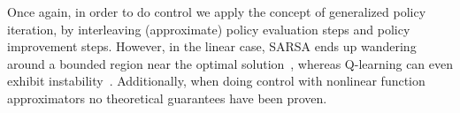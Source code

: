 Once again, in order to do control we apply the concept of generalized policy iteration, by interleaving (approximate) policy evaluation steps and policy improvement steps. However, in the linear case, SARSA ends up wandering around a bounded region near the optimal solution~\cite{gordon1996, gordon2001}, whereas Q-learning can even exhibit instability~\cite{baird1995}. Additionally, when doing control with nonlinear function approximators no theoretical guarantees have been proven.
